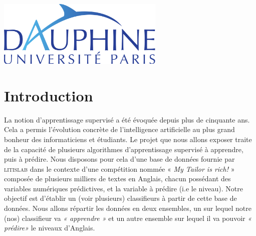 \documentclass[11pt]{article}
\begin{document}
\begin{titlepage}
	\leavevmode \newline 	\leavevmode \newline 	\leavevmode \newline 	\leavevmode \newline 	\leavevmode \newline 
	\includegraphics[width=0.6\textwidth]{dauphine.png}\\[1cm] 
	 

	

	
\end{titlepage}

\renewcommand{\thesection}{\Roman{section}}
\renewcommand{\thesubsection}{\thesection.\Roman{subsection}}





\section{Introduction}


La notion d'apprentissage supervisé a été évoquée depuis plus de cinquante ans. Cela a permis l’évolution concrète de l’intelligence artificielle au plus grand bonheur des informaticiens et étudiants. Le projet que nous allons exposer traite de la capacité de plusieurs algorithmes d’apprentissage supervisé à apprendre, puis à prédire. \newline  \newline
Nous disposons pour cela d’une base de données fournie par \textsc{litislab} dans le contexte d'une compétition nommée « \textit {My Tailor is rich!} » composée de plusieurs milliers de textes en Anglais, chacun possédant des variables numériques prédictives, et la variable à prédire (i.e le niveau). \newline \newline
Notre objectif est d'établir un (voir plusieurs) classifieurs à partir de cette base de données. Nous allons répartir les données en deux ensembles, un sur lequel notre (nos) classifieur va \textit {« apprendre »} et un autre ensemble sur lequel il va pouvoir \textit {« prédire» } le niveaux d'Anglais.\newline 
\end{document}
